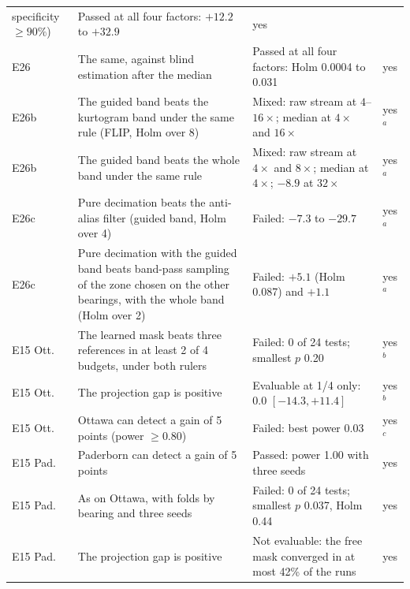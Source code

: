 {\begin{longtable}{@{}>{\raggedright\arraybackslash}p{}%
  >{\raggedright\arraybackslash}p{}%
  >{\raggedright\arraybackslash}p{}p{}@{}}
  specificity $\geq 90\%$) & Passed at all four factors: $+12.2$ to $+32.9$ & yes \\
E26 & The same, against blind estimation after the median & Passed at all four factors: Holm
  0.0004 to 0.031 & yes \\
E26b & The guided band beats the kurtogram band under the same rule (FLIP, Holm over 8) & Mixed:
  raw stream at $4$--$16\times$; median at $4\times$ and $16\times$ & yes$^a$ \\
E26b & The guided band beats the whole band under the same rule & Mixed: raw stream at $4\times$
  and $8\times$; median at $4\times$; $-8.9$ at $32\times$ & yes$^a$ \\
E26c & Pure decimation beats the anti-alias filter (guided band, Holm over 4) & Failed: $-7.3$ to
  $-29.7$ & yes$^a$ \\
E26c & Pure decimation with the guided band beats band-pass sampling of the zone chosen on the
  other bearings, with the whole band (Holm over 2) & Failed: $+5.1$ (Holm 0.087) and $+1.1$ &
  yes$^a$ \\
E15 Ott. & The learned mask beats three references in at least 2 of 4 budgets, under both rulers
  & Failed: 0 of 24 tests; smallest $p$ 0.20 & yes$^b$ \\
E15 Ott. & The projection gap is positive & Evaluable at 1/4 only: 0.0 $[-14.3, +11.4]$ &
  yes$^b$ \\
E15 Ott. & Ottawa can detect a gain of 5 points (power $\geq 0.80$) & Failed: best power 0.03 &
  yes$^c$ \\
E15 Pad. & Paderborn can detect a gain of 5 points & Passed: power 1.00 with three seeds & yes \\
E15 Pad. & As on Ottawa, with folds by bearing and three seeds & Failed: 0 of 24 tests; smallest $p$
  0.037, Holm 0.44 & yes \\
E15 Pad. & The projection gap is positive & Not evaluable: the free mask converged in at most 42\%
  of the runs & yes \\
\end{longtable}
}

